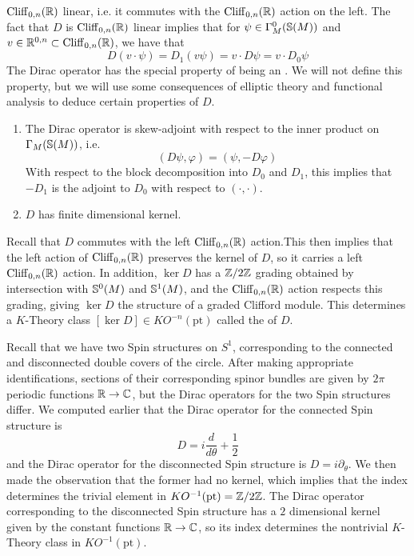 $\Cliff_{0,n}(\R)$ linear, i.e. it commutes with the $\Cliff_{0,n}(\R)$ action on the
left. The fact that $D$ is $\Cliff_{0,n}(\R)$ linear implies that for
$\psi \in \Gamma^0_M(\S(M))$ and $v \in \R^{0,n} \subset \Cliff_{0,n}(\R)$, we have that
\[
D(v\cdot\psi) = D_1(v\psi) = v\cdot D\psi = v \cdot D_0\psi
\]
The Dirac operator has the special property of being an
. We will not define this property, but we will use some
consequences of elliptic theory and functional analysis to deduce
certain properties of $D$.
\begin{enumerate}
  \item The Dirac operator is skew-adjoint with respect to the inner product on
  $\Gamma_M(\S(M))$, i.e.
  \[
  (D\psi,\varphi) = (\psi, -D\varphi)
  \]
  With respect to the block decomposition into $D_0$ and $D_1$, this implies that
  $-D_1$ is the adjoint to $D_0$ with respect to $(\cdot,\cdot)$.
  \item $D$ has finite dimensional kernel.
\end{enumerate}
%
Recall that $D$ commutes with the left $\Cliff_{0,n}(\R)$ action.This then implies that
the left action of $\Cliff_{0,n}(\R)$ preserves the kernel of $D$, so it carries
a left $\Cliff_{0,n}(\R)$ action. In addition, $\ker D$ has a $\Z/2\Z$ grading obtained
by intersection with $\S^0(M)$ and $\S^1(M)$, and the $\Cliff_{0,n}(\R)$ action
respects this grading, giving $\ker D$ the structure of a graded Clifford module.
This determines a $K$-Theory class $[\ker D] \in KO^{-n}(\mathrm{pt})$ called
the  of $D$.
%
\begin{exmp}
Recall that we have two Spin structures on $S^1$, corresponding to the connected
and disconnected double covers of the circle. After making appropriate identifications,
sections of their corresponding spinor bundles are given by $2\pi$ periodic functions
$\R \to \C$, but the Dirac operators for the two Spin structures differ. We computed
earlier that the Dirac operator for the connected Spin structure is
\[
D = i\frac{d}{d\theta} + \frac{1}{2}
\]
and the Dirac operator for the disconnected Spin structure is $D = i\partial_\theta$.
We then made the observation that the former had no kernel, which implies that
the index determines the trivial element in $KO^{-1}(\mathrm{pt}) = \Z/2\Z$.
The Dirac operator corresponding to the disconnected Spin structure has a
$2$ dimensional kernel given by the constant functions $\R \to \C$, so its
index determines the nontrivial $K$-Theory class in $KO^{-1}(\mathrm{pt})$.
\end{exmp}
%
\begin{exmp}

\end{exmp}

